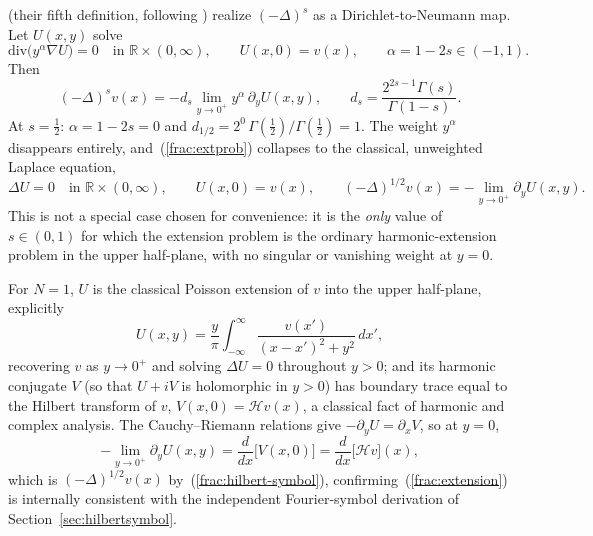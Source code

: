\documentclass{article}
\newcommand{\HT}{\mathcal{H}}
\begin{document}
\citet{daoud2022fractional} (their fifth definition, following
\citealp{caffarelli2007extension}) realize $(-\Delta)^s$ as a
Dirichlet-to-Neumann map. Let $U(x,y)$ solve
\begin{equation}
\mathrm{div}\big(y^\alpha\nabla U\big) = 0 \quad\text{in } \mathbb{R}\times(0,\infty),
\qquad U(x,0) = v(x),
\qquad \alpha = 1-2s \in (-1,1).
\label{frac:extprob}
\end{equation}
Then
\begin{equation}
(-\Delta)^s v(x) = -d_s\lim_{y\to0^+} y^\alpha\,\partial_y U(x,y),
\qquad
d_s = \frac{2^{2s-1}\Gamma(s)}{\Gamma(1-s)}.
\label{frac:extformula}
\end{equation}
At $s=\tfrac12$: $\alpha = 1-2s = 0$ and
$d_{1/2}=2^0\,\Gamma(\tfrac12)/\Gamma(\tfrac12)=1$. The weight $y^\alpha$
disappears entirely, and~(\ref{frac:extprob}) collapses to the classical,
unweighted Laplace equation,
\begin{equation}
\boxed{\Delta U = 0 \quad\text{in } \mathbb{R}\times(0,\infty), \qquad
U(x,0)=v(x)}, \qquad
(-\Delta)^{1/2}v(x) = -\lim_{y\to0^+}\partial_y U(x,y).
\label{frac:extension}
\end{equation}
This is not a special case chosen for convenience: it is the \emph{only}
value of $s\in(0,1)$ for which the extension problem is the ordinary
harmonic-extension problem in the upper half-plane, with no singular or
vanishing weight at $y=0$.

For $N=1$, $U$ is the classical Poisson extension of $v$ into the upper
half-plane, explicitly
\begin{equation}
U(x,y) = \frac{y}{\pi}\int_{-\infty}^{\infty}
  \frac{v(x')}{(x-x')^2+y^2}\,dx',
\label{frac:poisson}
\end{equation}
recovering $v$ as $y\to0^+$ and solving $\Delta U=0$ throughout $y>0$; and
its harmonic conjugate $V$ (so that $U+iV$ is holomorphic in
$y>0$) has boundary trace equal to the Hilbert transform of $v$,
$V(x,0)=\HT v(x)$, a classical fact of harmonic and complex analysis. The
Cauchy--Riemann relations give $-\partial_yU = \partial_xV$, so at $y=0$,
\begin{equation}
-\lim_{y\to0^+}\partial_yU(x,y) = \frac{d}{dx}\big[V(x,0)\big]
= \frac{d}{dx}\big[\HT v\big](x),
\end{equation}
which is $(-\Delta)^{1/2}v(x)$ by~(\ref{frac:hilbert-symbol}),
confirming~(\ref{frac:extension}) is internally consistent with the
independent Fourier-symbol derivation of Section~\ref{sec:hilbertsymbol}.
\end{document}
